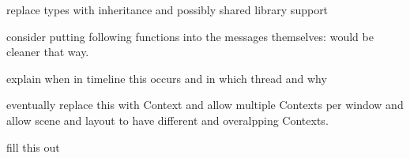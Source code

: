 \begin{DoxyRefList}
replace types with inheritance and possibly shared library support  
\item[\label{todo__todo000001}%
\hypertarget{todo__todo000001}{}%
\-Member \hyperlink{classNeb_1_1app_acefbc3bb3de71f3c8cca0afc1fada857}{\-Neb\-:\-:app\-:\-:recv\-\_\-scene\-\_\-create} (std\-::shared\-\_\-ptr$<$ gal\-::network\-::message $>$)]consider putting following functions into the messages themselves\-: would be cleaner that way.  
\item[\label{todo__todo000004}%
\hypertarget{todo__todo000004}{}%
\-Member \hyperlink{classNeb_1_1Camera_1_1View_1_1Base_aa3c5978efc6cd916f0f91bb8def375c5}{\-Neb\-:\-:\-Camera\-:\-:\-View\-:\-:\-Base\-:\-:step} (double)=0]explain when in timeline this occurs and in which thread and why  
\item[\label{todo__todo000011}%
\hypertarget{todo__todo000011}{}%
\-Class \hyperlink{classNeb_1_1renderable}{\-Neb\-:\-:renderable} ]eventually replace this with \-Context and allow multiple \-Contexts per window and allow scene and layout to have different and overalpping \-Contexts.  
\item[\label{todo__todo000015}%
\hypertarget{todo__todo000015}{}%
\-Member \hyperlink{classNeb_1_1Shape_1_1desc_a8356295ceee1f17dd24afbdb455dd206}{\-Neb\-:\-:\-Shape\-:\-:desc\-:\-:operator$<$$<$} (\-Neb\-::\-Shape\-::shape\-\_\-w const \&)]fill this out 
\end{DoxyRefList}
